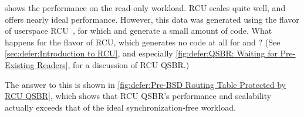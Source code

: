 shows the performance on the read-only workload.
RCU scales quite well, and offers nearly ideal performance.
However, this data was generated using the 
flavor of userspace
RCU~\cite{MathieuDesnoyers2009URCU,PaulMcKenney2013LWNURCU},
for which  and 
generate a small amount of code.
What happens for the  flavor of RCU, which generates no code at all
for  and ?
(See \cref{sec:defer:Introduction to RCU},
and especially
\cref{fig:defer:QSBR: Waiting for Pre-Existing Readers},
for a discussion of RCU QSBR\@.)

The answer to this is shown in
\cref{fig:defer:Pre-BSD Routing Table Protected by RCU QSBR},
which shows that RCU QSBR's performance and scalability actually exceeds
that of the ideal synchronization-free workload.

